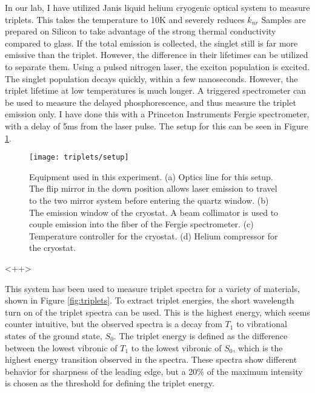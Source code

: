 \documentclass[../thesis.tex]{subfiles}
\begin{document}
In our lab, I have utilized Janis liquid helium cryogenic optical system to measure triplets.
This takes the temperature to 10K and severely reduces $k_{nr}$
Samples are prepared on Silicon to take advantage of the strong thermal conductivity compared to glass.
If the total emission is collected, the singlet still is far more emissive than the triplet.
However, the difference in their lifetimes can be utilized to separate them.
Using a pulsed nitrogen laser, the exciton population is excited. 
The singlet population decays quickly, within a few nanoseconds.
However, the triplet lifetime at low temperatures is much longer.
A triggered spectrometer can be used to measure the delayed phosphorescence, and thus measure the triplet emission only.
I have done this with a Princeton Instruments Fergie spectrometer, with a delay of 5ms from the laser pulse.
The setup for this can be seen in Figure \ref{fig:triplets_setup}.

\begin{figure}[ht]
\centering
\texttt{[image: triplets/setup]}
\caption{Equipment used in this experiment.  (a) Optics line for this setup.  The flip mirror in the down position allows laser emission to travel to the two mirror system before entering the quartz window. (b) The emission window of the cryostat.  A beam collimator is used to couple emission into the fiber of the Fergie spectrometer.  (c) Temperature controller for the cryostat.  (d) Helium compressor for the cryostat.}
\label{fig:triplets_setup}
\end{figure}<++>

This system has been used to measure triplet spectra for a variety of materials, shown in Figure \ref{fig:triplets}.
To extract triplet energies, the short wavelength turn on of the triplet spectra can be used.  
This is the highest energy, which seems counter intuitive, but the observed spectra is a decay from $T_1$ to vibrational states of the ground state, $S_0$. 
The triplet energy is defined as the difference between the lowest vibronic of $T_1$ to the lowest vibronic of $S_0$, which is the highest energy transition observed in the spectra.
These spectra show different behavior for sharpness of the leading edge, but a 20\% of the maximum intensity is chosen as the threshold for defining the triplet energy.


\end{document}
